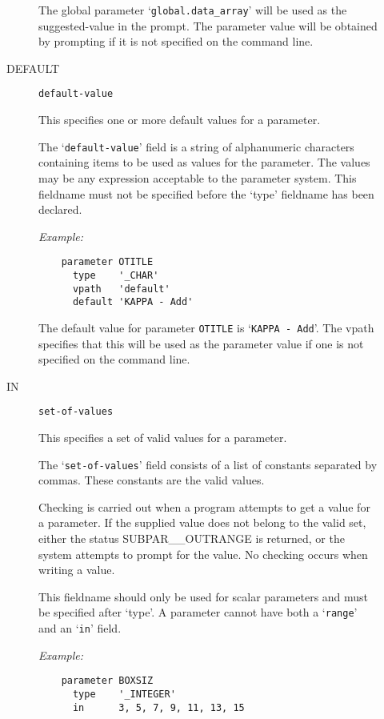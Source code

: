 \begin{description}
\begin{description}
The global parameter `\verb+global.data_array+' will be used as the
suggested-value in the prompt.
The parameter value will be obtained by prompting if it is not specified on
the command line.

\item [DEFAULT] {\tt default-value}

This specifies one or more default values for a parameter.

The `\verb+default-value+' field is a string of alphanumeric characters
containing items to be used as values for the parameter.
The values may be any expression acceptable to the parameter system.
This fieldname must not be specified before the `type' fieldname has been
declared.

{\em Example:}

\begin{small}
\begin{verbatim}
    parameter OTITLE
      type    '_CHAR'
      vpath   'default'
      default 'KAPPA - Add'
\end{verbatim}
\end{small}

The default value for parameter \verb+OTITLE+ is `\verb+KAPPA - Add+'.
The vpath specifies that this will be used as the parameter value if one
is not specified on the command line.

\item [IN] {\tt set-of-values}

This specifies a set of valid values for a parameter.

The `\verb+set-of-values+' field consists of a list of constants separated by
commas.
These constants are the valid values.

Checking is carried out when a program attempts to get a value for a parameter.
If the supplied value does not belong to the valid set, either the status
SUBPAR\_\_OUTRANGE is returned, or the system attempts to prompt for the value.
No checking occurs when writing a value.

This fieldname should only be used for scalar parameters and must be specified
after `type'.
A parameter cannot have both a `\verb+range+' and an `\verb+in+' field.

{\em Example:}

\begin{small}
\begin{verbatim}
    parameter BOXSIZ
      type    '_INTEGER'
      in      3, 5, 7, 9, 11, 13, 15
\end{verbatim}
\end{small}


\end{description}
\end{description}
